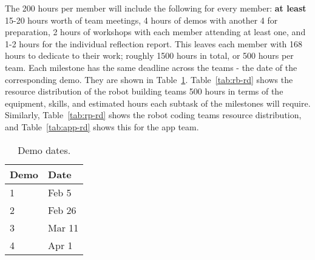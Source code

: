 \documentclass{article}
\begin{document}
The 200 hours per member will include the following for every member: {\bf at least} 15-20 hours worth of team meetings, 4 hours of demos with another 4 for preparation, 2 hours of workshops with each member attending at least one, and 1-2 hours for the individual reflection report. This leaves each member with 168 hours to dedicate to their work; roughly 1500 hours in total, or 500 hours per team. Each milestone has the same deadline across the teams - the date of the corresponding demo. They are shown in Table~\ref{tab:demo-dates}. Table~\ref{tab:rb-rd} shows the resource distribution of the robot building teams 500 hours in terms of the equipment, skills, and estimated hours each subtask of the milestones will require. Similarly, Table~\ref{tab:rp-rd} shows the robot coding teams resource distribution, and Table~\ref{tab:app-rd} shows this for the app team.
\begin{table}[]
  \begin{center}
  \begin{tabular}{ll}
    \hline
    Demo & Date   \\
    \hline
    1 & Feb 5 \\
    2 & Feb 26 \\
    3 & Mar 11 \\
    4 & Apr 1\\ \hline
  \end{tabular}
  \end{center}
  \caption{Demo dates.}
  \label{tab:demo-dates}
\end{table}
\end{document}
